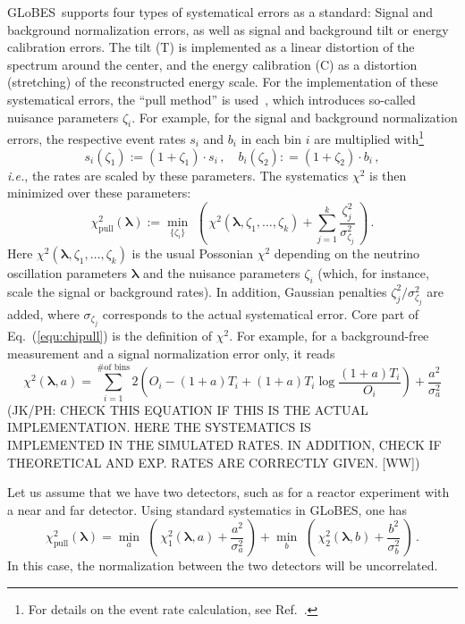 \documentclass[12pt,a4paper]{article}
\newcommand{\ie}{{\it i.e.}}
\newcommand{\eq}{Eq.}
\newcommand{\Ref}{Ref.}
\newcommand{\GLOBES}{{\sf GLoBES}}
\newcommand{\equ}[1]{\eq~(\ref{equ:#1})}
\begin{document}
\GLOBES\ supports four types of systematical errors as a standard: Signal and background
normalization errors, as well as signal and background tilt or energy calibration errors.
The tilt (T) is implemented as a linear distortion of the spectrum around the center,
and the energy calibration (C) as a distortion (stretching) of the reconstructed energy scale.
For the implementation of these systematical errors, the  ``pull method'' is used~\cite{Fogli:2002pt}, which introduces  so-called nuisance parameters $\zeta_i$. 
For example, for the signal and background normalization errors, the respective event rates 
$s_i$ and $b_i$ in
each bin $i$ are multiplied with\footnote{For details on the event rate calculation, see \Ref~\cite{Huber:2004ka}.}
\begin{equation}
s_i(\zeta_1) := (1+\zeta_1)\cdot s_i \, , \quad b_i(\zeta_2) : =(1+\zeta_2)\cdot b_i \, ,
\end{equation} 
\ie, the rates are scaled by these parameters. The systematics $\chi^2$ is then minimized over
these parameters:
\begin{equation}
\chi^2_\mathrm{pull}(\boldsymbol{\lambda}):=\min_{\{\zeta_i\} } \,\, \left( \,
\chi^2(\boldsymbol{\lambda},
\zeta_1, \ldots, \zeta_k)+ \sum_{j=1}^{k} \frac{\zeta_j^2}{\sigma_{\zeta_j}^2}
\, \right)\,.
\label{equ:chipull}
\end{equation}
Here $\chi^2(\boldsymbol{\lambda}, \zeta_1, \ldots, \zeta_k)$ is the usual Possonian $\chi^2$
depending on the neutrino oscillation parameters $\boldsymbol{\lambda}$ and the nuisance
parameters $\zeta_i$ (which, for instance, scale the signal or background rates).
In addition, Gaussian penalties $\zeta_j^2/\sigma_{\zeta_j}^2$ are added, where 
$\sigma_{\zeta_j}$ corresponds to the actual systematical error.
Core part of \equ{chipull} is the definition of $\chi^2$. For example, for a background-free measurement and
a signal normalization error only, it reads
\begin{equation}
  \chi^2 (\boldsymbol{\lambda},a) =  \sum_{i=1}^{\textrm{\# of bins}}2
     \left( O_{i} - (1 + a) T_{i} +
       (1 + a) T_{i} \log \frac{(1 + a) T_{i}}{O_{i}}  \right) + \frac{a^2}{\sigma_a^2} 
\label{equ:chistandard}
\end{equation}
(JK/PH: CHECK THIS EQUATION IF THIS IS THE ACTUAL IMPLEMENTATION. HERE THE SYSTEMATICS IS\\
IMPLEMENTED IN THE SIMULATED RATES. IN ADDITION, CHECK IF THEORETICAL AND EXP. RATES
ARE CORRECTLY GIVEN. [WW])

Let us assume that we have two detectors, such as for a reactor experiment with a near and
far detector. Using standard systematics in \GLOBES , one has
\begin{equation}
\chi^2_\mathrm{pull}(\boldsymbol{\lambda}) = \min_{a } \,\, \left( \,
\chi_1^2(\boldsymbol{\lambda},a)+ \frac{a^2}{\sigma_{a}^2} \, \right)
+\min_{ b } \,\, \left( \,
\chi_2^2(\boldsymbol{\lambda},b)+ \frac{b^2}{\sigma_{b}^2}
\, \right)\,.
\label{equ:chipullex}
\end{equation}
In this case, the normalization between the two detectors will be uncorrelated.
\end{document}
